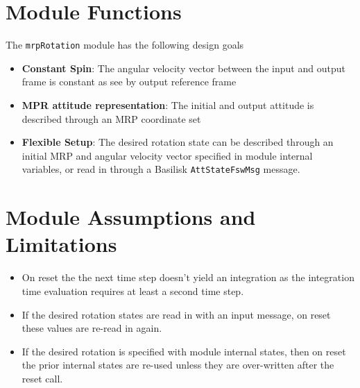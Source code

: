 

\section{Module Functions}
The {\tt mrpRotation} module has the following design goals
\begin{itemize}
	\item \textbf{Constant Spin}: The angular velocity vector between the input and output frame is constant as see by output reference frame
	\item \textbf{MPR attitude representation}: The initial and output attitude is described through an MRP coordinate set
	\item \textbf{Flexible Setup}:  The desired rotation state can be described through an initial MRP and angular velocity vector specified in module internal variables, or read in through a Basilisk {\tt AttStateFswMsg} message.
\end{itemize}

\section{Module Assumptions and Limitations}
\begin{itemize}
	\item On reset the the next time step doesn't yield an integration as the integration time evaluation requires at least a second time step.
	\item If the desired rotation states are read in with an input message, on reset these values are re-read in again.
	\item If the desired rotation is specified with module internal states, then on reset the prior internal states are re-used unless they are over-written after the reset call.
\end{itemize}